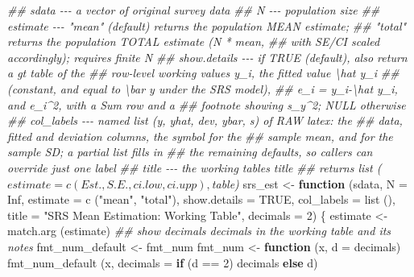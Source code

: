 \documentclass[
  letterpaper,
  DIV=11,
  numbers=noendperiod]{scrreprt}
\newenvironment{Shaded}{\begin{snugshade}}{\end{snugshade}}
\newcommand{\AttributeTok}[1]{\textcolor[rgb]{0.40,0.45,0.13}{#1}}
\newcommand{\ConstantTok}[1]{\textcolor[rgb]{0.56,0.35,0.01}{#1}}
\newcommand{\ControlFlowTok}[1]{\textcolor[rgb]{0.00,0.23,0.31}{\textbf{#1}}}
\newcommand{\DecValTok}[1]{\textcolor[rgb]{0.68,0.00,0.00}{#1}}
\newcommand{\DocumentationTok}[1]{\textcolor[rgb]{0.37,0.37,0.37}{\textit{#1}}}
\newcommand{\FunctionTok}[1]{\textcolor[rgb]{0.28,0.35,0.67}{#1}}
\newcommand{\NormalTok}[1]{\textcolor[rgb]{0.00,0.23,0.31}{#1}}
\newcommand{\OtherTok}[1]{\textcolor[rgb]{0.00,0.23,0.31}{#1}}
\newcommand{\SpecialCharTok}[1]{\textcolor[rgb]{0.37,0.37,0.37}{#1}}
\newcommand{\StringTok}[1]{\textcolor[rgb]{0.13,0.47,0.30}{#1}}
\renewcommand{\[}{\begin{equation}}
\renewcommand{\]}{\end{equation}}
\begin{document}
\begin{Shaded}
\begin{Highlighting}[]
\DocumentationTok{\#\# sdata {-}{-}{-} a vector of original survey data}
\DocumentationTok{\#\# N {-}{-}{-} population size}
\DocumentationTok{\#\# estimate {-}{-}{-} "mean" (default) returns the population MEAN estimate;}
\DocumentationTok{\#\#              "total" returns the population TOTAL estimate (N * mean,}
\DocumentationTok{\#\#              with SE/CI scaled accordingly); requires finite N}
\DocumentationTok{\#\# show.details {-}{-}{-} if TRUE (default), also return a gt table of the}
\DocumentationTok{\#\#                  row{-}level working values y\_i, the fitted value \textbackslash{}hat y\_i}
\DocumentationTok{\#\#                  (constant, and equal to \textbackslash{}bar y under the SRS model),}
\DocumentationTok{\#\#                  e\_i = y\_i{-}\textbackslash{}hat y\_i, and e\_i\^{}2, with a Sum row and a}
\DocumentationTok{\#\#                  footnote showing s\_y\^{}2; NULL otherwise}
\DocumentationTok{\#\# col\_labels {-}{-}{-} named list (y, yhat, dev, ybar, s) of RAW latex: the}
\DocumentationTok{\#\#                data, fitted and deviation columns, the symbol for the}
\DocumentationTok{\#\#                sample mean, and for the sample SD; a partial list fills in}
\DocumentationTok{\#\#                the remaining defaults, so callers can override just one label}
\DocumentationTok{\#\# title {-}{-}{-} the working table\textquotesingle{}s title}
\DocumentationTok{\#\# returns list ($estimate = c(Est., S.E., ci.low, ci.upp), $table)}
\NormalTok{srs\_est }\OtherTok{\textless{}{-}} \ControlFlowTok{function}\NormalTok{ (sdata, }\AttributeTok{N =} \ConstantTok{Inf}\NormalTok{, }\AttributeTok{estimate =} \FunctionTok{c}\NormalTok{ (}\StringTok{"mean"}\NormalTok{, }\StringTok{"total"}\NormalTok{),}
                      \AttributeTok{show.details =} \ConstantTok{TRUE}\NormalTok{, }\AttributeTok{col\_labels =} \FunctionTok{list}\NormalTok{ (),}
                      \AttributeTok{title =} \StringTok{"SRS Mean Estimation: Working Table"}\NormalTok{, }\AttributeTok{decimals =} \DecValTok{2}\NormalTok{)}
\NormalTok{\{}
\NormalTok{    estimate }\OtherTok{\textless{}{-}} \FunctionTok{match.arg}\NormalTok{ (estimate)}
    \DocumentationTok{\#\# show \textasciigrave{}decimals\textasciigrave{} decimals in the working table and its notes}
\NormalTok{    fmt\_num\_default }\OtherTok{\textless{}{-}}\NormalTok{ fmt\_num}
\NormalTok{    fmt\_num }\OtherTok{\textless{}{-}} \ControlFlowTok{function}\NormalTok{ (x, }\AttributeTok{d =}\NormalTok{ decimals) }\FunctionTok{fmt\_num\_default}\NormalTok{ (x, }\AttributeTok{decimals =} \ControlFlowTok{if}\NormalTok{ (d }\SpecialCharTok{==} \DecValTok{2}\NormalTok{) decimals }\ControlFlowTok{else}\NormalTok{ d)}

\end{Highlighting}
\end{Shaded}
\end{document}
